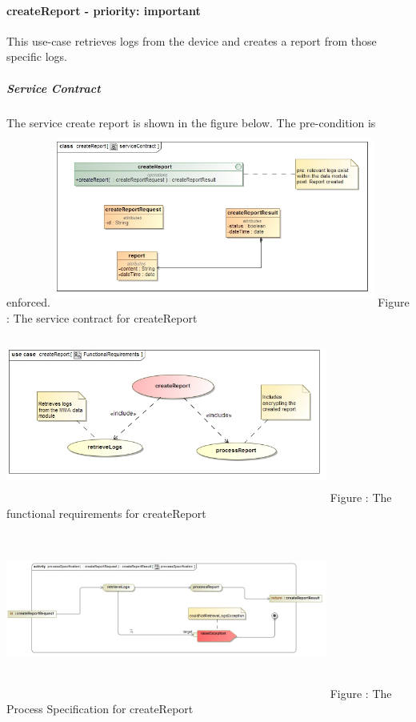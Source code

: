 \documentclass[hidelinks, 12pt, oneside]{article}
\begin{document}
		\paragraph{ createReport - priority: important}
		This use-case retrieves logs from the device and creates a report from those specific logs.\newline
		\subparagraph{Service Contract}
					The service create report is shown in the figure below. The pre-condition is enforced.  \newline
				\includegraphics[width=400px,height=220px]{img/serviceContractcreateReport.jpg}
					Figure : The service contract for createReport\newline
				\includegraphics[width=400px,height=220px]{img/FunctionalRequirementscreateReport.jpg}
					Figure : The functional requirements for createReport \newline
				\includegraphics[width=400px,height=220px]{img/processSpecificationcreateReport.jpg}
								Figure : The Process Specification for createReport\newline
								
\end{document}
